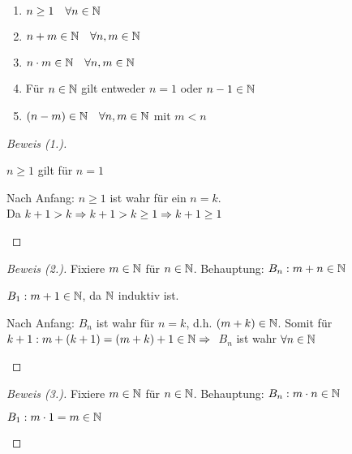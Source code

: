 \newpage

\begin{satz}
    \label{satz:n-eigenschaften}
    \theoremescape
    \begin{enumerate}
        \item $n\geq 1\quad\forall n\in\mathbb{N}$
        \item $n+m\in\mathbb{N}\quad\forall n,m\in\mathbb{N}$
        \item $n\cdot m\in\mathbb{N}\quad\forall n,m\in\mathbb{N}$
        \item Für $n\in\mathbb{N}$ gilt entweder $n=1$ oder $n-1\in\mathbb{N}$
        \item $(n-m) \in \mathbb{N}\quad\forall n,m\in\mathbb{N}$ mit $m<n$
    \end{enumerate}
    \begin{proof}[Beweis (1.)]
        ~\\
        \begin{induktionsanfang}
            $n\geq 1$ gilt für $n=1$
        \end{induktionsanfang}
        \begin{induktionsschritt}
            Nach Anfang: $n\geq 1$ ist wahr für ein $n=k$.\\
            Da $k+1>k\Rightarrow{} k+1>k\geq 1 \Rightarrow{} k+1\geq 1$\qedhere
        \end{induktionsschritt}
    \end{proof}
    \begin{proof}[Beweis (2.)]
        Fixiere $m\in\mathbb{N}$ für $n\in\mathbb{N}$. Behauptung: $B_n: m+n\in \mathbb{N}$\\
        \begin{induktionsanfang}
            $B_1: m+1 \in \mathbb{N}$, da $\mathbb{N}$ induktiv ist.
        \end{induktionsanfang}
        \begin{induktionsschritt}
            Nach Anfang: $B_n$ ist wahr für $n=k$, d.h. $(m+k)\in\mathbb{N}$. Somit für $k+1: m+(k+1) = (m+k)+1\in\mathbb{N} \Rightarrow{}$ $B_n$ ist wahr $\forall n\in\mathbb{N}$\qedhere
        \end{induktionsschritt}
    \end{proof}
    \begin{proof}[Beweis (3.)]
        Fixiere $m\in\mathbb{N}$ für $n\in\mathbb{N}$. Behauptung: $B_n: m\cdot n\in \mathbb{N}$\\
        \begin{induktionsanfang}
            $B_1: m\cdot 1=m \in \mathbb{N}$
        \end{induktionsanfang}
        \begin{induktionsschritt}

\end{induktionsschritt}
\end{proof}
\end{satz}
